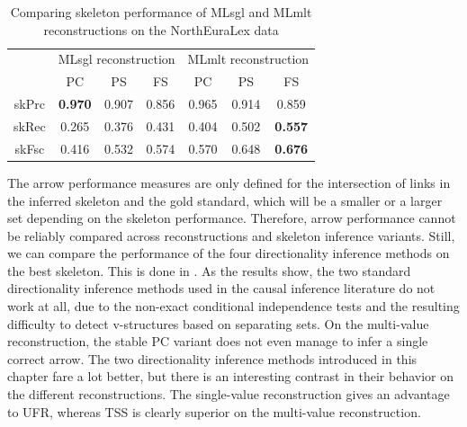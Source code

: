 \begin{table}
 \centering
 \begin{tabular}{ccccccc}
  \hline \hline
   & \multicolumn{3}{l}{MLsgl reconstruction} & \multicolumn{3}{l}{MLmlt reconstruction}\\ 
   & PC & PS & FS & PC & PS & FS\\ \hline
  skPrc & \textbf{0.970} & 0.907 & 0.856 & 0.965 & 0.914 & 0.859\\
  skRec & 0.265 & 0.376 & 0.431 & 0.404 & 0.502 & \textbf{0.557}\\
  skFsc & 0.416 & 0.532 & 0.574 & 0.570 & 0.648 & \textbf{0.676}\\
  \hline
 \end{tabular}
 \caption{Comparing skeleton performance of MLsgl and MLmlt reconstructions on the NorthEuraLex data}
 \label{skeleton-evaluation-nelex}
\end{table}

\largerpage
The arrow performance measures are only defined for the intersection of links in the inferred skeleton and the gold standard, which will be a smaller or a larger set depending on the skeleton performance. Therefore, arrow performance cannot be reliably compared across reconstructions and skeleton inference variants. Still, we can compare the performance of the four directionality inference methods on the best skeleton. This is done in . As the results show, the two standard directionality inference methods used in the causal inference literature do not work at all, due to the non-exact conditional independence tests and the resulting difficulty to detect v-structures based on separating sets. On the multi-value reconstruction, the stable PC variant does not even manage to infer a single correct arrow. The two directionality inference methods introduced in this chapter fare a lot better, but there is an interesting contrast in their behavior on the different reconstructions. 
The single-value reconstruction gives an advantage to UFR, whereas TSS is clearly superior on the multi-value reconstruction.

